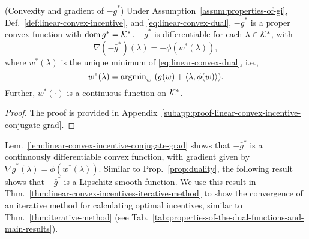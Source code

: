 
\begin{lemma} (Convexity and gradient of $-\bar{g}^*$)
\label{lem:linear-convex-incentive-conjugate-grad}
Under Assumption~\ref{assum:properties-of-gi}, Def.~\ref{def:linear-convex-incentive}, and \eqref{eq:linear-convex-dual}, $-\bar{g}^*$ is a proper convex function with $\operatorname{dom}{\bar{g}^*} = \mathcal{K}^*$.
$-\bar{g}^*$ is differentiable for each $\lambda \in \mathcal{K}^*$, with
\begin{equation}
\label{eq:linear-convex-incentive-conjugate-grad}
    \nabla (-\bar{g}^*)(\lambda) = -\phi(w^*(\lambda)), 
\end{equation}
where $w^*(\lambda)$ is the unique minimum of \eqref{eq:linear-convex-dual}, i.e.,
\begin{equation}
\label{eq:linear-convex-incentive-conjugate-grad-w}
    w^*(\lambda) = \textstyle{\operatorname*{argmin}}_w \ (g(w) + \langle \lambda, \phi(w)\rangle).
\end{equation}
Further, $w^*(\cdot)$ is a continuous function on $\mathcal{K}^*$.
\end{lemma}

\begin{proof}
The proof is provided in Appendix~\ref{subapp:proof-linear-convex-incentive-conjugate-grad}.
\end{proof}

Lem.~\ref{lem:linear-convex-incentive-conjugate-grad} shows that $-\bar{g}^*$ is a continuously differentiable convex function, with gradient given by $\nabla \bar{g}^*(\lambda) = \phi(w^*(\lambda))$.
Similar to Prop.~\ref{prop:duality}, the following result shows that $-\bar{g}^*$ is a Lipschitz smooth function.
We use this result in Thm.~\ref{thm:linear-convex-incentives-iterative-method} to show the convergence of an iterative method for calculating optimal incentives, similar to Thm.~\ref{thm:iterative-method} (see Tab.~\ref{tab:properties-of-the-dual-functions-and-main-results}).

